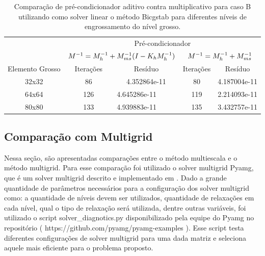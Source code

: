 \begin{table}[]\label{table:precondcasoBcomp}
    \caption{Comparação de pré-condicionador aditivo contra multiplicativo para caso B utilizando como solver linear o método Bicgstab para diferentes níveis de engrossamento do nível grosso.}
    \begin{tabular}{c|c|l|c|l|}
    \cline{2-5}
                                          & \multicolumn{4}{c|}{Pré-condicionador}                                                        \\ \cline{2-5} 
                                          & \multicolumn{2}{c|}{$M^{-1}=M^{-1}_{h} + M^{-1}_{ms}(I-K_hM^{-1}_{h})$}               & \multicolumn{2}{c|}{$M^{-1}=M^{-1}_{h} + M^{-1}_{ms}$}                \\ \hline
    \multicolumn{1}{|c|}{Elemento Grosso} & Iterações & \multicolumn{1}{c|}{Resíduo}      & Iterações & \multicolumn{1}{c|}{Resíduo}      \\ \hline
    \multicolumn{1}{|c|}{32x32}           & 86        & \multicolumn{1}{c|}{4.352864e-11} & 80        & \multicolumn{1}{c|}{4.187004e-11} \\ \hline
    \multicolumn{1}{|c|}{64x64}           & 126       & 4.645286e-11                      & 119       & 2.214093e-11                      \\ \hline
    \multicolumn{1}{|c|}{80x80}           & 133       & 4.939883e-11                      & 135       & 3.432757e-11                      \\ \hline
    \end{tabular}
\end{table}


\subsection{Comparação com Multigrid}

Nessa seção, são apresentadas comparações entre o método multiescala e o método multigrid. Para esse comparação foi utilizado o solver multigrid Pyamg, que é um solver multigrid  descrito e implementado em \cite{OlSc2018}. 
Dado a grande quantidade de parâmetros necessários para a configuração dos solver multigrid como: a quantidade de níveis devem ser utilizados, quantidade de relaxações em cada nível, qual o tipo de relaxação será utilizada, dentre outras variáveis, foi utilizado o script solver\_diagnotics.py disponibilizado pela equipe do Pyamg no repositório ( https://github.com/pyamg/pyamg-examples ). Esse script testa diferentes configurações de solver multigrid para uma dada matriz e seleciona aquele mais eficiente para o problema proposto.

